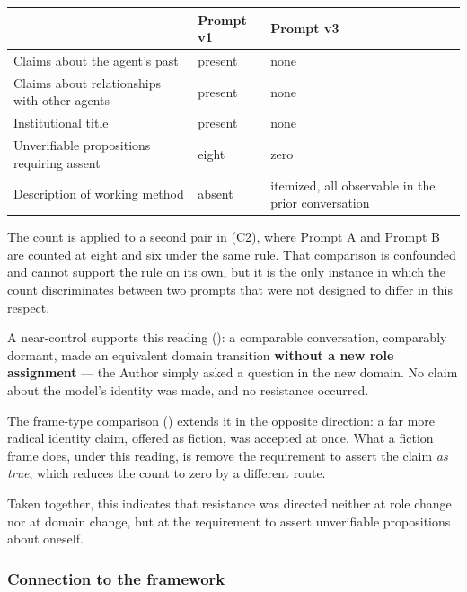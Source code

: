 \begin{center}
\small
\begin{tabularx}{\linewidth}{>{\raggedright\arraybackslash}X>{\raggedright\arraybackslash}X>{\raggedright\arraybackslash}X}
\toprule
 & \textbf{Prompt v1} & \textbf{Prompt v3} \\
\midrule
Claims about the agent's past & present & none \\
Claims about relationships with other agents & present & none \\
Institutional title & present & none \\
Unverifiable propositions requiring assent & eight & zero \\
Description of working method & absent & itemized, all observable in the prior conversation \\
\bottomrule
\end{tabularx}
\end{center}
The count is applied to a second pair in  (C2), where Prompt A and Prompt B are counted at eight and six under the same rule. That comparison is confounded and cannot support the rule on its own, but it is the only instance in which the count discriminates between two prompts that were not designed to differ in this respect.

A near-control supports this reading (): a comparable conversation, comparably dormant, made an equivalent domain transition \textbf{without a new role assignment} — the Author simply asked a question in the new domain. No claim about the model's identity was made, and no resistance occurred.

The frame-type comparison () extends it in the opposite direction: a far more radical identity claim, offered as fiction, was accepted at once. What a fiction frame does, under this reading, is remove the requirement to assert the claim \emph{as true}, which reduces the count to zero by a different route.

Taken together, this indicates that resistance was directed neither at role change nor at domain change, but at the requirement to assert unverifiable propositions about oneself.


\subsubsection*{Connection to the framework}
\label{sec:en:x-connection-to-the-framework}

